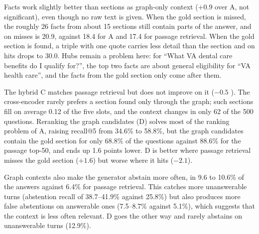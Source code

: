 Facts work slightly better than sections as graph-only context ($+0.9$ \fone{} over A,
not significant), even though no raw text is given. When the gold section is missed,
the roughly 26 facts from about 15 sections still contain parts of the answer, and
\fone{} on misses is 20.9, against 18.4 for A and 17.4 for passage retrieval. When the
gold section is found, a triple with one quote carries less detail than the section and
\fone{} on hits drops to 30.0. Hubs remain a problem here: for ``What VA dental care
benefits do I qualify for?'', the top two facts are about general eligibility for ``VA
health care'', and the facts from the gold section only come after them.

The hybrid C matches passage retrieval but does not improve on it ($-0.5$ \fone{}). The
cross-encoder rarely prefers a section found only through the graph; such sections fill
on average 0.12 of the five slots, and the context changes in only 62 of the 500
questions. Reranking the graph candidates (D) solves most of the ranking problem of A,
raising recall@5 from 34.6\% to 58.8\%, but the graph candidates contain the gold section
for only 68.8\% of the questions against 88.6\% for the passage top-50, and \fone{} ends
up 1.6 points lower. D is better where passage retrieval misses the gold section
($+1.6$) but worse where it hits ($-2.1$).

Graph contexts also make the generator abstain more often, in 9.6 to 10.6\% of the answers
against 6.4\% for passage retrieval. This catches more unanswerable turns (abstention
recall of 38.7--41.9\% against 25.8\%) but also produces more false abstentions on
answerable ones (7.5--8.7\% against 5.1\%), which suggests that the context is less often
relevant. D goes the other way and rarely abstains on unanswerable turns (12.9\%).

